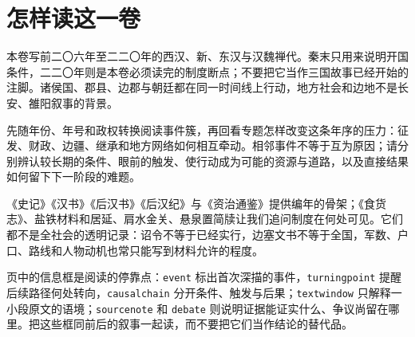 \chapter*{怎样读这一卷}

本卷写前二〇六年至二二〇年的西汉、新、东汉与汉魏禅代。秦末只用来说明开国条件，二二〇年则是本卷必须读完的制度断点；不要把它当作三国故事已经开始的注脚。诸侯国、郡县、边郡与朝廷都在同一时间线上行动，地方社会和边地不是长安、雒阳叙事的背景。

先随年份、年号和政权转换阅读事件簇，再回看专题怎样改变这条年序的压力：征发、财政、边疆、继承和地方网络如何相互牵动。相邻事件不等于互为原因；请分别辨认较长期的条件、眼前的触发、使行动成为可能的资源与道路，以及直接结果如何留下下一阶段的难题。

《史记》《汉书》《后汉书》《后汉纪》与《资治通鉴》提供编年的骨架；《食货志》、盐铁材料和居延、肩水金关、悬泉置简牍让我们追问制度在何处可见。它们都不是全社会的透明记录：诏令不等于已经实行，边塞文书不等于全国，军数、户口、路线和人物动机也常只能写到材料允许的程度。

页中的信息框是阅读的停靠点：\texttt{event} 标出首次深描的事件，\texttt{turningpoint} 提醒后续路径何处转向，\texttt{causalchain} 分开条件、触发与后果；\texttt{textwindow} 只解释一小段原文的语境；\texttt{sourcenote} 和 \texttt{debate} 则说明证据能证实什么、争议尚留在哪里。把这些框同前后的叙事一起读，而不要把它们当作结论的替代品。

